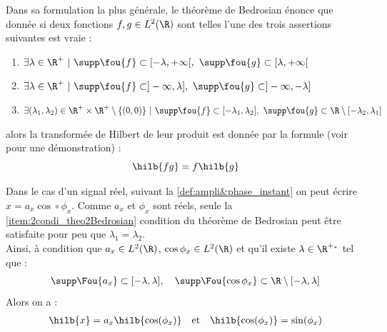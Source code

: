 \begin{theoreme}[de Bedrosian]\label{theo:2Bedrosian}
	Dans sa formulation la plus générale, le théorème de Bedrosian énonce que donnée si deux fonctions $f,g\in L^2(\R)$ sont telles l'une des trois assertions suivantes est vraie :
	\newline
	\begin{enumerate}[label=\textit{\arabic*}. ]
		
		\item $\exists \lambda\in\R^+\ |\ \supp \fou{f} \subset [-\lambda, +\infty[,\ \supp \fou{g} \subset [\lambda, +\infty[$\label{item:1condi_theo2Bedrosian}
		
		\item $\exists \lambda\in\R^+\ |\ \supp \fou{f} \subset ]-\infty, \lambda],\ \supp \fou{g} \subset ]-\infty,-\lambda]$ \label{item:2condi_theo2Bedrosian}
		
		\item $\exists (\lambda_1,\lambda_2)\in \R^+\times\R^+ \setminus\{(0,0)\}\ |\ \supp \fou{f} \subset [-\lambda_1, \lambda_2],\ \supp \fou{g} \subset \R\setminus[-\lambda_2,\lambda_1]$
		
	\end{enumerate}
	alors la transformée de Hilbert de leur produit est donnée par la formule (voir \cite{wang_simple_2009} pour une démonstration) :
	\begin{equation}\label{eq:2Bedrosian}
		\hilb{fg} = f\hilb{g}
 	\end{equation}
\end{theoreme}

\begin{corollaire}\label{coro:AM-FM}
	Dans le cas d'un signal réel, suivant la \cref{def:ampli&phase_instant} on peut écrire \newline $x=a_x\cos\circ\phi_x$.
	Comme $a_x$ et $\phi_x$ sont réels, seule la \ref{item:2condi_theo2Bedrosian} condition du théorème de Bedrosian peut être satisfaite pour peu que $\lambda_1=\lambda_2$.
	\\
	Ainsi, à condition que $a_x\in L^2(\R)$, $\cos\phi_x\in L^2(\R)$ et qu'il existe $\lambda\in\R^{+_*}$ tel que :
	\[\supp \Fou{a_x} \subset [-\lambda, \lambda],\quad \supp \Fou{\cos\phi_x} \subset \R\setminus[-\lambda,\lambda]\]
	 Alors on a :
	\begin{align*}
		\hilb{x} &= a_x\hilb{\cos(\phi_x)}  &  &\text{et}  &  \hilb{\cos(\phi_x)} = \sin(\phi_x)
	\end{align*}
\end{corollaire}



